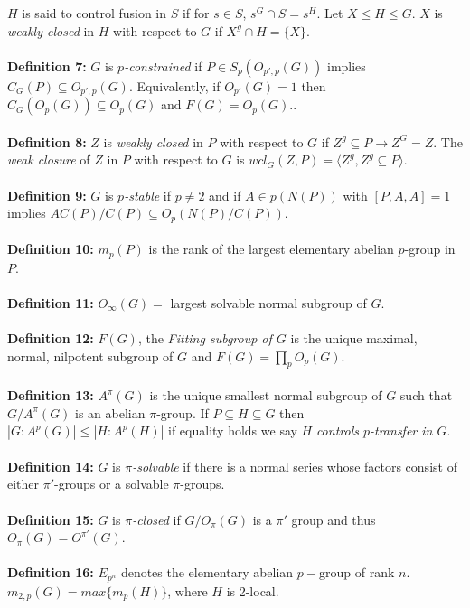 $H$ is said to 
control fusion in $S$ if for $s \in S$, $s^G \cap S = s^H$.
Let $X \le H \le G$.  $X$ is \emph{weakly closed} in $H$ with respect to $G$ if
$X^g \cap H = \{X\}$.\\
\\
{\bf Definition 7:}
$G$ is $p$\emph{-constrained} if 
$P \in S_p ( O_{p',p} (G))$ implies $C_G(P) \subseteq O_{p',p} (G)$.
Equivalently, if $O_{p'}(G)=1$ then $C_G(O_p(G)) \subseteq O_p(G)$ and $F(G)= O_p(G)$..
\\
\\
{\bf Definition 8:}
$Z$ is \emph {weakly closed} in $P$ with respect to $G$ if $Z^g \subseteq P \rightarrow Z^G=Z$.
The \emph {weak closure} of $Z$ in $P$ with respect to $G$ is $wcl_G(Z, P)= 
\langle Z^g, Z^g \subseteq P \rangle $.
\\
\\
{\bf Definition 9:}
$G$ is $p$\emph{-stable} if $p \ne 2$ and 
if $A \in p(N(P))$ with $[P,A,A]= 1$ implies $A C(P)/C(P) \subseteq O_p (N(P)/C(P))$.
\\
\\
{\bf Definition 10:}
$m_p(P)$ is the rank of the largest elementary abelian $p$-group in $P$.
\\
\\
{\bf Definition 11:}
$O_{\infty}(G)=$ largest solvable normal subgroup of $G$.
\\
\\
{\bf Definition 12:} $F(G)$, the \emph{Fitting subgroup of $G$}
is the unique maximal, normal, nilpotent subgroup of $G$ and
$F(G)= \prod_p O_p(G)$.
\\
\\
{\bf Definition 13:} $A^{\pi}(G)$ is the unique smallest normal subgroup of $G$ such that
$G/A^{\pi}(G)$ is an abelian $\pi$-group.  If $P \subseteq H \subseteq G$ then
$ |G:A^p(G)| \le |H:A^p(H)|$ if equality holds we say $H$ \emph {controls $p$-transfer in $G$}.
\\
\\
{\bf Definition 14:}
$G$  is
$\pi$\emph{-solvable} if there is a normal series whose factors
consist of either $\pi'$-groups or a solvable
$\pi$-groups.
\\
\\
{\bf Definition 15:} $G$ is $\pi$\emph{-closed} if $G/O_{\pi}(G)$ is a $\pi'$ group and thus
$O_{\pi}(G)=O^{\pi'}(G)$.
\\
\\
{\bf Definition 16:}
$E_{p^n}$ denotes the elementary abelian $p-$group of rank $n$.
$m_{2,p}(G) = max \{ m_p (H) \}$, where $H$ is 2-local.

